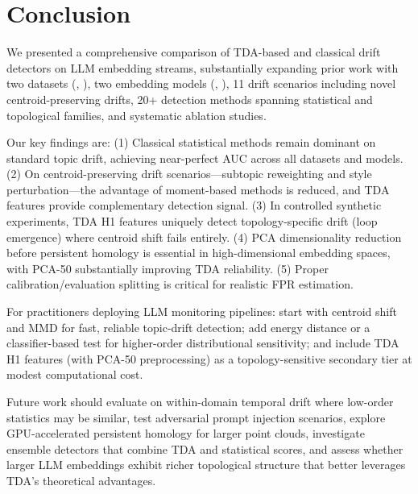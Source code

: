 \section{Conclusion}
\label{sec:conclusion}

We presented a comprehensive comparison of TDA-based and classical drift detectors on LLM embedding streams, substantially expanding prior work with two datasets (\agnews, \twentyng), two embedding models (\minilm, \bertbase), 11 drift scenarios including novel centroid-preserving drifts, 20+ detection methods spanning statistical and topological families, and systematic ablation studies.

Our key findings are: (1) Classical statistical methods remain dominant on standard topic drift, achieving near-perfect AUC across all datasets and models. (2) On centroid-preserving drift scenarios---subtopic reweighting and style perturbation---the advantage of moment-based methods is reduced, and TDA features provide complementary detection signal. (3) In controlled synthetic experiments, TDA H1 features uniquely detect topology-specific drift (loop emergence) where centroid shift fails entirely. (4) PCA dimensionality reduction before persistent homology is essential in high-dimensional embedding spaces, with PCA-50 substantially improving TDA reliability. (5) Proper calibration/evaluation splitting is critical for realistic FPR estimation.

For practitioners deploying LLM monitoring pipelines: start with centroid shift and MMD for fast, reliable topic-drift detection; add energy distance or a classifier-based test for higher-order distributional sensitivity; and include TDA H1 features (with PCA-50 preprocessing) as a topology-sensitive secondary tier at modest computational cost.

Future work should evaluate on within-domain temporal drift where low-order statistics may be similar, test adversarial prompt injection scenarios, explore GPU-accelerated persistent homology for larger point clouds, investigate ensemble detectors that combine TDA and statistical scores, and assess whether larger LLM embeddings exhibit richer topological structure that better leverages TDA's theoretical advantages.
